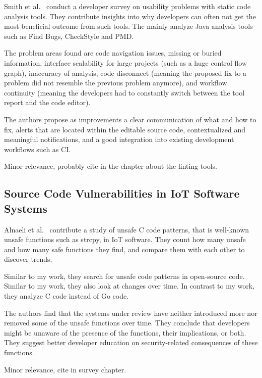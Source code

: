 Smith et al.~\cite{smith2020} conduct a developer survey on usability problems with static code analysis tools.
They contribute insights into why developers can often not get the most beneficial outcome from such tools.
The mainly analyze Java analysis tools such as Find Bugs, CheckStyle and PMD\@.

The problem areas found are code navigation issues, missing or buried information, interface scalability for large
projects (such as a huge control flow graph), inaccuracy of analysis, code disconnect (meaning the proposed fix to a
problem did not resemble the previous problem anymore), and workflow continuity (meaning the developers had to
constantly switch between the tool report and the code editor).

The authors propose as improvements a clear communication of what and how to fix, alerts that are located within the
editable source code, contextualized and meaningful notifications, and a good integration into existing development
workflows such as CI.

Minor relevance, probably cite in the chapter about the linting tools.



\subsection{Source Code Vulnerabilities in IoT Software Systems}
\label{subsec:source-code-vulnerabilities-in-iot-software-systems}

Alnaeli et al.~\cite{alnaeli2017} contribute a study of unsafe C code patterns, that is well-known unsafe
functions such as strcpy, in IoT software.
They count how many unsafe and how many safe functions they find, and compare them with each other to discover trends.

Similar to my work, they search for unsafe code patterns in open-source code.
Similar to my work, they also look at changes over time.
In contrast to my work, they analyze C code instead of Go code.

The authors find that the systems under review have neither introduced more nor removed some of the unsafe functions
over time.
They conclude that developers might be unaware of the presence of the functions, their implications, or both.
They suggest better developer education on security-related consequences of these functions.

Minor relevance, cite in survey chapter.


